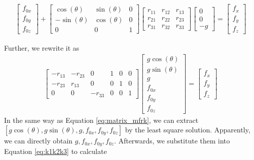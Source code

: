 \begin{equation}
\begin{split}
\begin{bmatrix}
f_{0x}\\
f_{0y}\\
f_{0z}
\end{bmatrix}
+
\begin{bmatrix}
\cos(\theta)	&\sin(\theta)	&0 \\
-\sin(\theta)	&\cos(\theta)	&0 \\
0				&0				&1
\end{bmatrix}
\begin{bmatrix}
r_{11}		&r_{12}		&r_{13} \\
r_{21}		&r_{22}		&r_{23} \\
r_{31}		&r_{32}		&r_{33}
\end{bmatrix}
\begin{bmatrix}
0\\
0\\
-g
\end{bmatrix}
=
\begin{bmatrix}
f_x\\
f_y\\
f_z
\end{bmatrix}
\end{split}
\end{equation}
\par
Further, we rewrite it as 
\begin{equation}
\begin{split}
\begin{bmatrix}
-r_{13}		&-r_{23} 	&0			&1		&0		&0\\
-r_{23}		&r_{13}		&0			&0		&1		&0\\
0			&0			&-r_{33}	&0		&0		&1
\end{bmatrix}
\begin{bmatrix}
g\cos(\theta)\\
g\sin(\theta)\\
g\\
f_{0x}\\
f_{0y}\\
f_{0z}
\end{bmatrix}
=
\begin{bmatrix}
f_x\\
f_y\\
f_z
\end{bmatrix}
\end{split}
\end{equation}
In the same way as Equation \ref{eq:matrix_mfrk}, we can extract $[g\cos(\theta),g\sin(\theta),g,f_{0x},f_{0y},f_{0z}]$ by the least square solution. Apparently, we can directly obtain $g,f_{0x},f_{0y},f_{0z}$. Afterwards, we substitute them into Equation \ref{eq:k1k2k3} to calculate 
